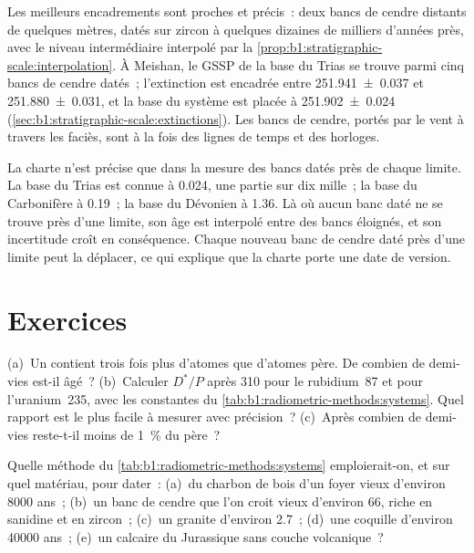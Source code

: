 Les meilleurs encadrements sont proches et précis~: deux bancs de cendre distants de quelques mètres, datés
sur zircon à quelques dizaines de milliers d'années près, avec le niveau intermédiaire
interpolé par la \cref{prop:b1:stratigraphic-scale:interpolation}. À Meishan,
le GSSP de la base du Trias se trouve parmi cinq bancs de cendre datés~;
l'extinction est encadrée entre \qty[uncertainty-mode=separate]{251.941(37)}{\Ma}
et \qty[uncertainty-mode=separate]{251.880(31)}{\Ma}, et la base du système
est placée à \qty[uncertainty-mode=separate]{251.902(24)}{\Ma}
(\cref{sec:b1:stratigraphic-scale:extinctions}). Les bancs de cendre, portés par le vent
à travers les faciès, sont à la fois des lignes de temps et des horloges.

La charte n'est précise que dans la mesure des bancs datés près de chaque limite. La base du
Trias est connue à \qty{0.024}{\Ma}, une partie sur dix mille~; la base du
Carbonifère à \qty{0.19}{\Ma}~; la base du Dévonien à
\qty{1.36}{\Ma}. Là où aucun banc daté ne se trouve près d'une limite, son âge est
interpolé entre des bancs éloignés, et son incertitude croît en conséquence. Chaque
nouveau banc de cendre daté près d'une limite peut la déplacer, ce qui explique que la charte porte une
date de version.

\section{Exercices}

\begin{exercise}[$\star$]\label{exo:b1:radiometric-methods:1}
(a)~Un  contient trois fois plus d'atomes  que d'atomes
père. De combien de demi-vies est-il âgé~? (b)~Calculer $D^*/P$ après
\qty{310}{\Ma} pour le rubidium~87 et pour l'uranium~235, avec les constantes du
\cref{tab:b1:radiometric-methods:systems}. Quel rapport est le plus facile à mesurer
avec précision~? (c)~Après combien de demi-vies reste-t-il moins de \qty{1}{\percent} du
père~?
\end{exercise}

\begin{exercise}[$\star$]\label{exo:b1:radiometric-methods:2}
Quelle méthode du \cref{tab:b1:radiometric-methods:systems} emploierait-on, et sur
quel matériau, pour dater~: (a)~du charbon de bois d'un foyer vieux d'environ \num{8000} ans~;
(b)~un banc de cendre que l'on croit vieux d'environ \qty{66}{\Ma}, riche en sanidine et
en zircon~; (c)~un granite d'environ \qty{2.7}{\Ga}~; (d)~une coquille d'environ
\num{40000} ans~; (e)~un calcaire du Jurassique sans couche volcanique~?
\end{exercise}

